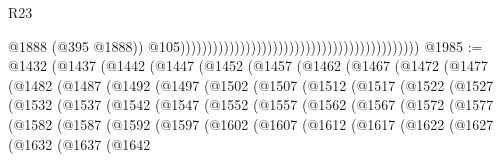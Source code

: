 \begin{lexlean}{R23}
\begin{coremodule}
                                                                                              @1888
                                                                                              (@395
                                                                                                @1888))
                                                                                            @105))))))))))))))))))))))))))))))))))))))))))))
@1985 := @1432
    (@1437
      (@1442
        (@1447
          (@1452
            (@1457
              (@1462
                (@1467
                  (@1472
                    (@1477
                      (@1482
                        (@1487
                          (@1492
                            (@1497
                              (@1502
                                (@1507
                                  (@1512
                                    (@1517
                                      (@1522
                                        (@1527
                                          (@1532
                                            (@1537
                                              (@1542
                                                (@1547
                                                  (@1552
                                                    (@1557
                                                      (@1562
                                                        (@1567
                                                          (@1572
                                                            (@1577
                                                              (@1582
                                                                (@1587
                                                                  (@1592
                                                                    (@1597
                                                                      (@1602
                                                                        (@1607
                                                                          (@1612
                                                                            (@1617
                                                                              (@1622
                                                                                (@1627
                                                                                  (@1632
                                                                                    (@1637
                                                                                      (@1642

\end{coremodule}
\end{lexlean}
